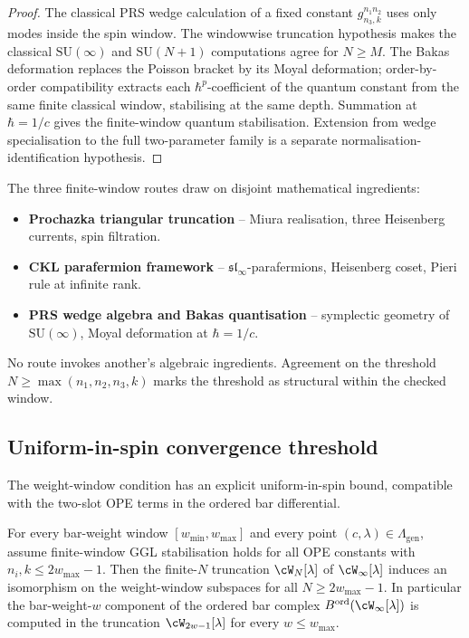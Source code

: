 \begin{proof}
The classical PRS wedge calculation of a fixed constant
\(g^{n_1 n_2}_{n_3,k}\) uses only modes inside the spin window.
The windowwise truncation hypothesis makes the classical
\(\mathrm{SU}(\infty)\) and \(\mathrm{SU}(N+1)\) computations
agree for \(N\ge M\). The Bakas deformation replaces the Poisson
bracket by its Moyal deformation; order-by-order compatibility
extracts each \(\hbar^p\)-coefficient of the quantum constant
from the same finite classical window, stabilising at the same
depth. Summation at \(\hbar = 1/c\) gives the finite-window
quantum stabilisation. Extension from wedge specialisation to
the full two-parameter family is a separate
normalisation-identification hypothesis.
\end{proof}

\begin{remark}
\label{rem:three-mechanisms-three-ingredients}
The three finite-window routes draw on disjoint mathematical
ingredients:
\begin{itemize}
\item \textbf{Prochazka triangular truncation} -- Miura
 realisation, three Heisenberg currents, spin filtration.
\item \textbf{CKL parafermion framework} --
 $\mathfrak{sl}_\infty$-parafermions, Heisenberg coset, Pieri
 rule at infinite rank.
\item \textbf{PRS wedge algebra and Bakas quantisation} --
 symplectic geometry of $\mathrm{SU}(\infty)$, Moyal deformation
 at $\hbar = 1/c$.
\end{itemize}
No route invokes another's algebraic ingredients. Agreement on
the threshold $N \ge \max(n_1, n_2, n_3, k)$ marks the threshold
as structural within the checked window.
\end{remark}

\subsection{Uniform-in-spin convergence threshold}
\label{subsec:uniform-in-spin-threshold}

The weight-window condition has an explicit uniform-in-spin bound,
compatible with the two-slot OPE terms in the ordered bar
differential.

\begin{proposition}[Uniform threshold $N_0(w_{\max}) = 2w_{\max} - 1$;
\ClaimStatusProvedHere]
\label{prop:uniform-threshold-2wmax-minus-1}
For every bar-weight window $[w_{\min}, w_{\max}]$ and every point
$(c, \lambda) \in \Lambda_{\mathrm{gen}}$, assume finite-window GGL
stabilisation holds for all OPE constants with
\(n_i,k\le 2w_{\max}-1\). Then the finite-$N$ truncation
$\cW_N[\lambda]$ of $\cW_\infty[\lambda]$ induces an isomorphism on
the weight-window subspaces for all $N \ge 2 w_{\max} - 1$. In
particular the bar-weight-$w$ component of the ordered bar complex
$B^{\mathrm{ord}}(\cW_\infty[\lambda])$ is computed in the truncation
$\cW_{2w - 1}[\lambda]$ for every $w \le w_{\max}$.
\end{proposition}

